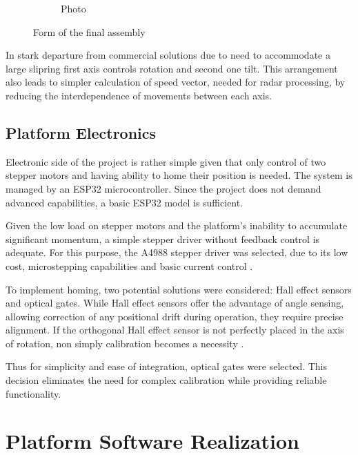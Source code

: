 \begin{figure}[h!]
\begin{subfigure}[b]{0.45\textwidth}
    \caption{Photo}
  \end{subfigure}
  \caption{Form of the final assembly}
  \label{fig:side_by_side}
\end{figure}

In stark departure from commercial solutions \cite{carl,standa} due to need to accommodate a large slipring first axis controls rotation and second one tilt.
This arrangement also leads to simpler calculation of speed vector, needed for radar processing, by reducing the interdependence of movements between each axis.


\subsection{Platform Electronics}


Electronic side of the project is rather simple given that only control of two stepper motors and having ability to home their position is needed.
The system is managed by an ESP32 microcontroller. Since the project does not demand advanced capabilities, a basic ESP32 model is sufficient.

Given the low load on stepper motors and the platform's inability to accumulate significant momentum, a simple stepper driver without feedback control is adequate.
For this purpose, the A4988 stepper driver was selected, due to its low cost, microstepping capabilities and basic current control \cite{a4988}.

To implement homing, two potential solutions were considered: Hall effect sensors and optical gates.
While Hall effect sensors offer the advantage of angle sensing, allowing correction of any positional drift during operation, they require precise alignment.
If the orthogonal Hall effect sensor is not perfectly placed in the axis of rotation, non simply calibration becomes a necessity \cite{hall}.

Thus for simplicity and ease of integration, optical gates were selected.
This decision eliminates the need for complex calibration while providing reliable functionality.

\section{Platform Software Realization}

